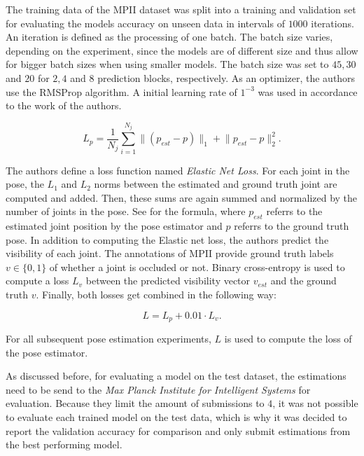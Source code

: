 The training data of the MPII dataset was split into a training and validation set for evaluating the models accuracy on unseen data in intervals of $1000$ iterations.
An iteration is defined as the processing of one batch.
The batch size varies, depending on the experiment, since the models are of different size and thus allow for bigger batch sizes when using smaller models.
The batch size was set to $45, 30$ and $20$ for $2, 4$ and $8$ prediction blocks, respectively.
As an optimizer, the authors use the RMSProp algorithm.
A initial learning rate of $1^{-3}$ was used in accordance to the work of the authors.

\begin{equation}
    \label{eq:elasticnetloss}
    L_p = \frac{1}{N_j} \sum_{i=1}^{N_j} \lVert(p_{est} - p)\rVert_1 + \lVert p_{est} - p \rVert^2_2.
\end{equation}

The authors define a loss function named \textit{Elastic Net Loss}.
For each joint in the pose, the $L_1$ and $L_2$ norms between the estimated and ground truth joint are computed and added.
Then, these sums are again summed and normalized by the number of joints in the pose.
See  for the formula, where $p_{est}$ referrs to the estimated joint position by the pose estimator and $p$ referrs to the ground truth pose.
In addition to computing the Elastic net loss, the authors predict the visibility of each joint.
The annotations of MPII provide ground truth labels $v \in \{0,1\}$ of whether a joint is occluded or not.
Binary cross-entropy is used to compute a loss $L_v$ between the predicted visibility vector $v_{est}$ and the ground truth $v$.
Finally, both losses get combined in the following way:

\begin{equation}
    L = L_p + 0.01 \cdot L_v.
\end{equation}

For all subsequent pose estimation experiments, $L$ is used to compute the loss of the pose estimator.

As discussed before, for evaluating a model on the test dataset, the estimations need to be send to the \textit{Max Planck Institute for Intelligent Systems} for evaluation.
Because they limit the amount of submissions to $4$, it was not possible to evaluate each trained model on the test data, which is why it was decided to report the validation accuracy for comparison and only submit estimations from the best performing model.


